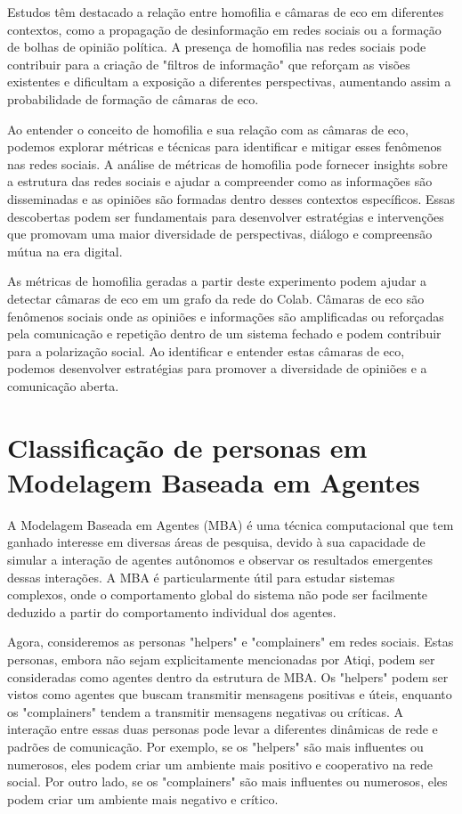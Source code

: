 Estudos têm destacado a relação entre homofilia e câmaras de eco em diferentes contextos, como a propagação de desinformação em redes sociais ou a formação de bolhas de opinião política. A presença de homofilia nas redes sociais pode contribuir para a criação de "filtros de informação" que reforçam as visões existentes e dificultam a exposição a diferentes perspectivas, aumentando assim a probabilidade de formação de câmaras de eco.

Ao entender o conceito de homofilia e sua relação com as câmaras de eco, podemos explorar métricas e técnicas para identificar e mitigar esses fenômenos nas redes sociais. A análise de métricas de homofilia pode fornecer insights sobre a estrutura das redes sociais e ajudar a compreender como as informações são disseminadas e as opiniões são formadas dentro desses contextos específicos. Essas descobertas podem ser fundamentais para desenvolver estratégias e intervenções que promovam uma maior diversidade de perspectivas, diálogo e compreensão mútua na era digital.

As métricas de homofilia geradas a partir deste experimento podem ajudar a detectar câmaras de eco em um grafo da rede do Colab. Câmaras de eco são fenômenos sociais onde as opiniões e informações são amplificadas ou reforçadas pela comunicação e repetição dentro de um sistema fechado e podem contribuir para a polarização social. Ao identificar e entender estas câmaras de eco, podemos desenvolver estratégias para promover a diversidade de opiniões e a comunicação aberta.

\section{Classificação de personas em Modelagem Baseada em Agentes}

A Modelagem Baseada em Agentes (MBA) é uma técnica computacional que tem ganhado interesse em diversas áreas de pesquisa, devido à sua capacidade de simular a interação de agentes autônomos e observar os resultados emergentes dessas interações. A MBA é particularmente útil para estudar sistemas complexos, onde o comportamento global do sistema não pode ser facilmente deduzido a partir do comportamento individual dos agentes.

Agora, consideremos as personas "helpers" e "complainers" em redes sociais. Estas personas, embora não sejam explicitamente mencionadas por Atiqi, podem ser consideradas como agentes dentro da estrutura de MBA. Os "helpers" podem ser vistos como agentes que buscam transmitir mensagens positivas e úteis, enquanto os "complainers" tendem a transmitir mensagens negativas ou críticas. A interação entre essas duas personas pode levar a diferentes dinâmicas de rede e padrões de comunicação. Por exemplo, se os "helpers" são mais influentes ou numerosos, eles podem criar um ambiente mais positivo e cooperativo na rede social. Por outro lado, se os "complainers" são mais influentes ou numerosos, eles podem criar um ambiente mais negativo e crítico.

